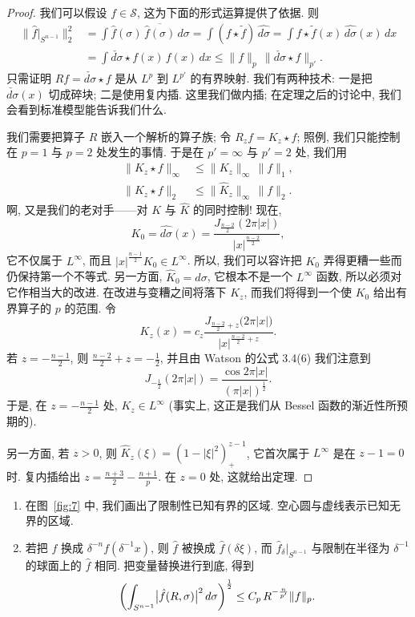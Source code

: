 \begin{proof}
我们可以假设 $f\in\mathcal{S}$, 这为下面的形式运算提供了依据. 则
\begin{align*}
\|\hat{f}|_{S^{n-1}}\|_{2}^{2}
&=\int\hat{f}(\sigma)\,\overline{\hat{f}(\sigma)}\,d\sigma
=\int(f\star\tilde{f})\,\widehat{d\sigma}
=\int f\star\tilde{f}(x)\,\widehat{d\sigma}(x)\,dx \\
&=\int\check{d\sigma}\star f(x)\,f(x)\,dx
\leq\|f\|_{p}\,\|\check{d\sigma}\star f\|_{p'}.
\end{align*}
只需证明 $Rf=\check{d\sigma}\star f$ 是从 $L^p$ 到 $L^{p'}$ 的有界映射. 我们有两种技术: 一是把 $\check{d\sigma}(x)$ 切成碎块; 二是使用复内插. 这里我们做内插; 在定理之后的讨论中, 我们会看到标准模型能告诉我们什么.

我们需要把算子 $R$ 嵌入一个解析的算子族; 令 $R_{z}f=K_{z}\star f$; 照例, 我们只能控制在 $p=1$ 与 $p=2$ 处发生的事情. 于是在 $p'=\infty$ 与 $p'=2$ 处, 我们用
\begin{align*}
\|K_{z}\star f\|_{\infty}&\leq\|K_{z}\|_{\infty}\,\|f\|_{1}, \\
\|K_{z}\star f\|_{2}&\leq\|\hat{K}_{z}\|_{\infty}\,\|f\|_{2}.
\end{align*}
啊, 又是我们的老对手——对 $K$ 与 $\hat{K}$ 的同时控制! 现在,
\[
K_{0}=\widehat{d\sigma}(x)=\frac{J_{\frac{n-2}{2}}(2\pi|x|)}{|x|^{\frac{n-2}{2}}},
\]
它不仅属于 $L^\infty$, 而且 $|x|^{\frac{n-1}{2}}K_0\in L^\infty$. 所以, 我们可以容许把 $K_0$ 弄得更糟一些而仍保持第一个不等式. 另一方面, $\hat{K}_0=d\sigma$, 它根本不是一个 $L^\infty$ 函数, 所以必须对它作相当大的改进. 在改进与变糟之间将落下 $K_z$, 而我们将得到一个使 $K_0$ 给出有界算子的 $p$ 的范围. 令
\[
K_{z}(x)=c_{z}\frac{J_{\frac{n-2}{2}+z}\bigl(2\pi|x|\bigr)}{|x|^{\frac{n-2}{2}+z}}.
\]
若 $z=-\frac{n-1}{2}$, 则 $\frac{n-2}{2}+z=-\frac{1}{2}$, 并且由 Watson 的公式 3.4(6) 我们注意到
\[
J_{-\frac{1}{2}}(2\pi|x|)=\frac{\cos 2\pi|x|}{(\pi|x|)^{\frac{1}{2}}}.
\]
于是, 在 $z=-\frac{n-1}{2}$ 处, $K_z\in L^\infty$ (事实上, 这正是我们从 Bessel 函数的渐近性所预期的).

另一方面, 若 $z>0$, 则 $\hat{K}_z(\xi)=(1-|\xi|^2)_+^{z-1}$, 它首次属于 $L^\infty$ 是在 $z-1=0$ 时. 复内插给出 $z=\frac{n+3}{2}-\frac{n+1}{p}$. 在 $z=0$ 处, 这就给出定理.
\end{proof}

\begin{remark}\label{rem:6.6}
\begin{enumerate}[label=\alph*)]
\item 在图~\ref{fig:7} 中, 我们画出了限制性已知有界的区域. 空心圆与虚线表示已知无界的区域.
\item 若把 $f$ 换成 $\delta^{-n}f(\delta^{-1}x)$, 则 $\hat{f}$ 被换成 $\hat{f}(\delta\xi)$, 而 $\hat{f}_\delta|_{S^{n-1}}$ 与限制在半径为 $\delta^{-1}$ 的球面上的 $\hat{f}$ 相同. 把变量替换进行到底, 得到
\[
\left(\int_{S^{n-1}}\bigl|\hat{f}(R,\sigma)\bigr|^{2}\,d\sigma\right)^{\frac{1}{2}}
\leq C_{p}\,R^{-\frac{n}{p'}}\|f\|_{p}. \qedhere
\]
\end{enumerate}
\end{remark}

